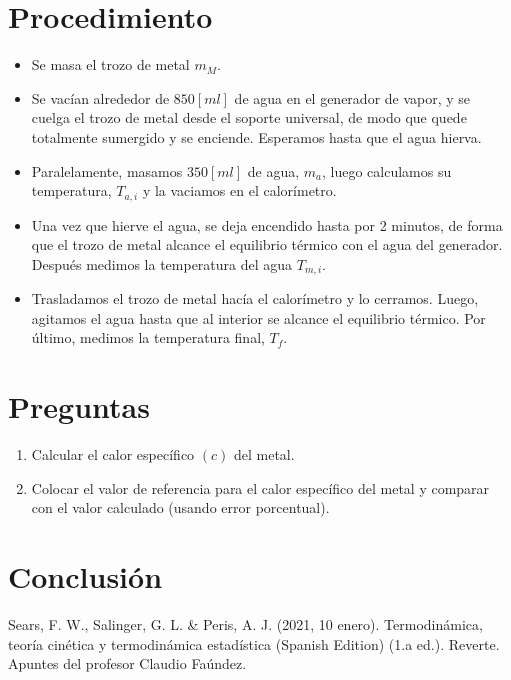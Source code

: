 \documentclass[a4paper, 12p]{article}
\begin{document}
\section{Procedimiento}

\begin{itemize}
      \item Se masa el trozo de metal $m_M$.
      \item Se vacían alrededor de $850 [ml]$ de agua en el generador de vapor, y se cuelga el trozo de metal desde el soporte universal,
      de modo que quede totalmente sumergido y se enciende. Esperamos hasta que el agua hierva.
      \item Paralelamente, masamos $350 [ml]$ de agua, $m_a$, luego calculamos su temperatura, $T_{a,i}$ y la vaciamos en el calorímetro. 
      \item Una vez que hierve el agua, se deja encendido hasta por 2 minutos, de forma que el trozo de metal alcance el 
      equilibrio térmico con el agua del generador. Después medimos la temperatura del agua $T_{m,i}$.
      \item Trasladamos el trozo de metal hacía el calorímetro y lo cerramos. Luego, agitamos el agua hasta que al interior se 
      alcance el equilibrio térmico. Por último, medimos la temperatura final, $T_f$.
\end{itemize}

\section{Preguntas}
\begin{enumerate}
    \item Calcular el calor específico $(c)$ del metal.
    \item Colocar el valor de referencia para el calor específico del metal y comparar con el valor calculado (usando error porcentual).
\end{enumerate}


\section{Conclusión}





\begin{thebibliography}{6}
       Sears, F. W., Salinger, G. L. \& Peris, A. J. (2021, 10 enero). Termodinámica, teoría cinética y termodinámica estadística (Spanish Edition) (1.a ed.). Reverte.
       Apuntes del profesor Claudio Faúndez.
\end{thebibliography}
\end{document}
